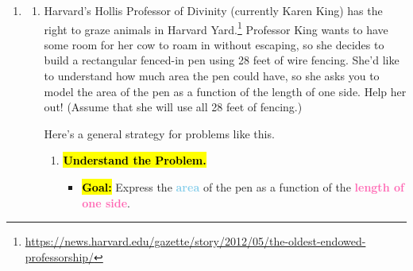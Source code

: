 \documentclass{article}
\newcommand{\goal}[1]{\textbf{\textcolor{skyblue}{#1}}}
\newcommand{\indvar}[1]{\textbf{\textcolor{hotpink}{#1}}}
\begin{document}
\begin{enumerate}
\begin{enumerate}
  \item


    \begin{problem}[\vfill]
      $f(h(x))$
    \end{problem}

    \begin{solution}
      Since $h(x) = 2x - 1$, this is the same as $f(2x - 1)$, or $\boxed{(2x - 1)^2}$.
    \end{solution}

  \item
    \begin{problem}[\vfill\newpage]
      $h(f(x))$
    \end{problem}

    \begin{solution}
      Since $f(x) = x^2$, this is the same as $h(x^2) = \boxed{2x^2 - 1}$.
    \end{solution}

  \end{enumerate}

\item  \label{modeling-rectangular-pen-1}

  \begin{enumerate}
  \item
    \begin{problem}[\vfill]
      Harvard's Hollis Professor of Divinity (currently Karen King) has the right to graze animals in Harvard Yard.\footnote{\url{https://news.harvard.edu/gazette/story/2012/05/the-oldest-endowed-professorship/}} Professor King wants to have some room for her cow to roam in without escaping, so she decides to build a rectangular fenced-in pen using 28 feet of wire fencing. She'd like to understand how much area the pen could have, so she asks you to model the area of the pen as a function of the length of one side. Help her out! (Assume that she will use all 28 feet of fencing.)
    \end{problem}

    \begin{solution}
      Here's a general strategy for problems like this.
      \begin{enumerate}[label=\arabic*.]
      \item \hl{\textbf{Understand the Problem.}}

        \begin{itemize}
        \item \hl{\textbf{Goal:}} Express the \goal{area} of the pen as a function of the \indvar{length of one side}.


\end{itemize}
\end{enumerate}
\end{solution}
\end{enumerate}
\end{enumerate}
\end{document}

